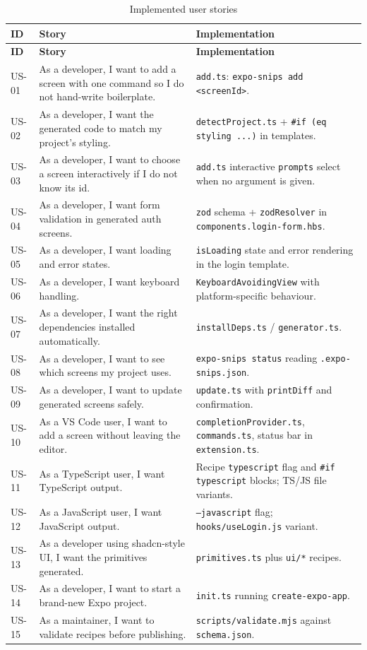 \begin{longtable}{@{}L{1.3cm}L{6.4cm}L{6.9cm}@{}}
\caption{Implemented user stories}\\
\toprule
\textbf{ID} & \textbf{Story} & \textbf{Implementation} \\
\midrule
\endfirsthead
\toprule
\textbf{ID} & \textbf{Story} & \textbf{Implementation} \\
\midrule
\endhead
US-01 & As a developer, I want to add a screen with one command so I do not hand-write boilerplate. & \texttt{add.ts}: \texttt{expo-snips add <screenId>}. \\
US-02 & As a developer, I want the generated code to match my project's styling. & \texttt{detectProject.ts} + \texttt{\#if (eq styling ...)} in templates. \\
US-03 & As a developer, I want to choose a screen interactively if I do not know its id. & \texttt{add.ts} interactive \texttt{prompts} select when no argument is given. \\
US-04 & As a developer, I want form validation in generated auth screens. & \texttt{zod} schema + \texttt{zodResolver} in \texttt{components.login-form.hbs}. \\
US-05 & As a developer, I want loading and error states. & \texttt{isLoading} state and error rendering in the login template. \\
US-06 & As a developer, I want keyboard handling. & \texttt{KeyboardAvoidingView} with platform-specific behaviour. \\
US-07 & As a developer, I want the right dependencies installed automatically. & \texttt{installDeps.ts} / \texttt{generator.ts}. \\
US-08 & As a developer, I want to see which screens my project uses. & \texttt{expo-snips status} reading \texttt{.expo-snips.json}. \\
US-09 & As a developer, I want to update generated screens safely. & \texttt{update.ts} with \texttt{printDiff} and confirmation. \\
US-10 & As a VS Code user, I want to add a screen without leaving the editor. & \texttt{completionProvider.ts}, \texttt{commands.ts}, status bar in \texttt{extension.ts}. \\
US-11 & As a TypeScript user, I want TypeScript output. & Recipe \texttt{typescript} flag and \texttt{\#if typescript} blocks; TS/JS file variants. \\
US-12 & As a JavaScript user, I want JavaScript output. & \texttt{--javascript} flag; \texttt{hooks/useLogin.js} variant. \\
US-13 & As a developer using shadcn-style UI, I want the primitives generated. & \texttt{primitives.ts} plus \texttt{ui/*} recipes. \\
US-14 & As a developer, I want to start a brand-new Expo project. & \texttt{init.ts} running \texttt{create-expo-app}. \\
US-15 & As a maintainer, I want to validate recipes before publishing. & \texttt{scripts/validate.mjs} against \texttt{schema.json}. \\
\bottomrule
\end{longtable}

